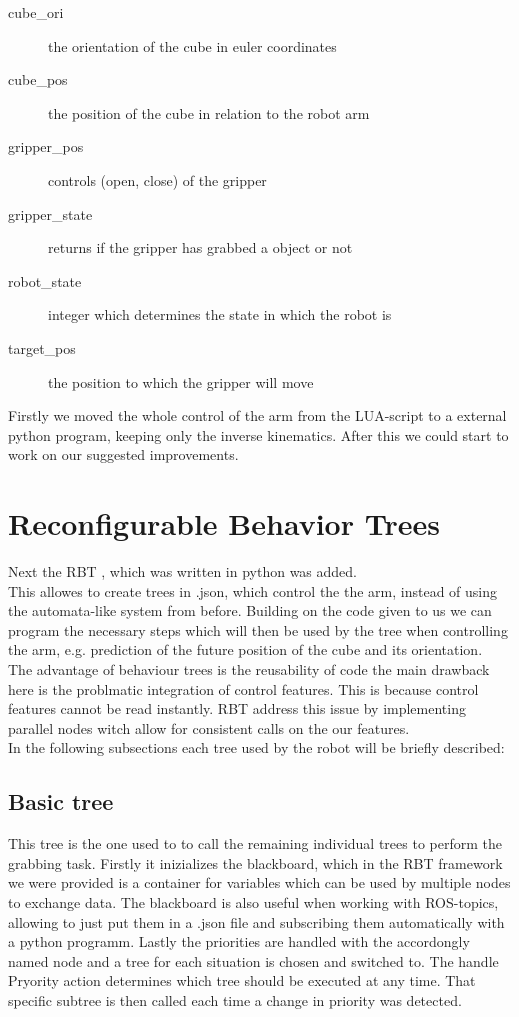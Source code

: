 \documentclass[report]{iisthesis}
\begin{document}
\begin{description}
    \item [cube\_ori] the orientation of the cube in euler coordinates 
    \item [cube\_pos] the position of the cube in relation to the robot arm
    \item [gripper\_pos] controls (open, close) of the gripper
    \item [gripper\_state] returns if the gripper has grabbed a object or not
    \item [robot\_state] integer which determines the state in which the robot is 
    \item [target\_pos] the position to which the gripper will move
\end{description}
\noindent
Firstly we moved the whole control of the arm from the LUA-script to a external python program, keeping only the inverse kinematics.
After this we could start to work on our suggested improvements. 

\section{Reconfigurable Behavior Trees}
Next the RBT \cite{DBLP:journals/corr/abs-2007-10663}, which was written in python was added. \\
This allowes to create trees in .json, which control the the arm, instead of using the automata-like system
from before.
Building on the code given to us we can program the necessary steps which will then be used by the tree when controlling the arm, e.g. prediction of
the future position of the cube and its orientation. \\
The advantage of behaviour trees is the reusability of code the main drawback here is the problmatic integration of control features. \cite{DBLP:journals/corr/abs-2007-10663}
This is because control features cannot be read instantly.
RBT address this issue by implementing parallel nodes witch allow for consistent calls on the our features. \\
In the following subsections each tree used by the robot will be briefly described:

\subsection{Basic tree}
This tree is the one used to to call the remaining individual trees to perform the grabbing task. Firstly it inizializes the blackboard, which in the RBT framework we were provided
is a container for variables which can be used by multiple nodes to exchange data. The blackboard is also useful when working with ROS-topics, allowing to just put them in a .json file and subscribing them automatically with a python programm.
Lastly the priorities are handled with the accordongly named node and a tree for each situation is chosen and switched to.
The handle Pryority action determines which tree should be executed at any time. That specific subtree is then called each time a change in priority was detected. 
\end{document}
